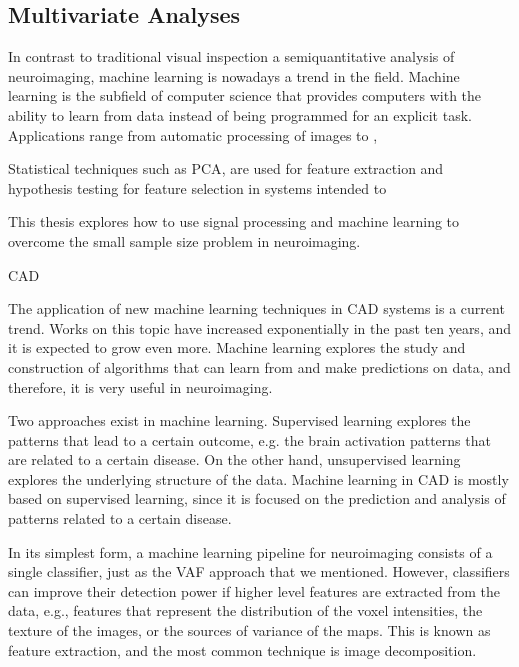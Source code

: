 \subsection{Multivariate Analyses}
In contrast to traditional visual inspection a semiquantitative analysis of neuroimaging, machine learning is nowadays a trend in the field. Machine learning is the subfield of computer science that provides computers with the ability to learn from data instead of being programmed for an explicit task. Applications range from automatic processing of images to , 

Statistical techniques such as \ac{PCA}, are used for feature extraction and hypothesis testing for feature selection in systems intended to 

This thesis explores how to use signal processing and machine learning to overcome the small sample size problem in neuroimaging. 

\ac{CAD}

The application of new machine learning techniques in CAD systems is a current trend. Works on this topic have increased exponentially in the past ten years, and it is expected to grow even more. Machine learning explores the study and construction of algorithms that can learn from and make predictions on data, and therefore, it is very useful in neuroimaging. 

Two approaches exist in machine learning. Supervised learning explores the patterns that lead to a certain outcome, e.g. the brain activation patterns that are related to a certain disease. On the other hand, unsupervised learning explores the underlying structure of the data. Machine learning in CAD is mostly based on supervised learning, since it is focused on the prediction and analysis of patterns related to a certain disease. 

In its simplest form, a machine learning pipeline for neuroimaging consists of a single classifier, just as the VAF approach that we mentioned. However, classifiers can improve their detection power if higher level features are extracted from the data, e.g., features that represent the distribution of the voxel intensities, the texture of the images, or the sources of variance of the maps. This is known as feature extraction, and the most common technique is image decomposition. 


